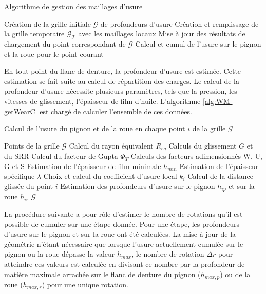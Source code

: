 \begin{algorithm}
\caption{Algorithme de gestion des maillages d'usure}
\label{alg:WM-createGrid}
  \begin{algorithmic}
      \State Création de la grille initiale $\mathcal{G}$ de profondeurs d'usure
    \Else
      \State Création et remplissage de la grille temporaire $\mathcal{G_T}$ avec les maillages locaux
          \State Mise à jour des résultats de chargement du point correspondant de $\mathcal{G}$
      \EndFor
    \EndIf
      \State Calcul et cumul de l'usure sur le pignon et la roue pour le point courant
    \EndFor
  \end{algorithmic}
\end{algorithm}

\FloatBarrier
En tout point du flanc de denture, la profondeur d'usure est estimée. Cette estimation se fait suite au calcul de répartition des charges. Le calcul de la profondeur d'usure nécessite plusieurs paramètres, tels que la pression, les vitesses de glissement, l'épaisseur de film d'huile. L'algorithme \ref{alg:WM-getWearC} est chargé de calculer l'ensemble de ces données.

\begin{algorithm}
\caption{Calcul de l'usure du pignon et de la roue en chaque point $i$ de la grille $\mathcal{G}$}
\label{alg:WM-getWearC}
  \begin{algorithmic}
    \Require Points de la grille $\mathcal{G}$
      \State Calcul du rayon équivalent $R_{eq}$
      \State Calculs du glissement $G$ et du SRR
      \State Calcul du facteur de Gupta $\Phi_T$
      \State Calculs des facteurs adimensionnés W, U, G et S
      \State Estimation de l'épaisseur de film minimale $h_{min}$
      \State Estimation de l'épaisseur spécifique $\lambda$
      \State Choix et calcul du coefficient d'usure local $k_i$
      \State Calcul de la distance glissée du point $i$
	    \State Estimation des profondeurs d'usure sur le pignon $h_{ip}$ et sur la roue $h_{ir}$
    \EndFor
    \State \Return $\mathcal{G}$
  \end{algorithmic}
\end{algorithm}
\FloatBarrier
La procédure suivante a pour rôle d'estimer le nombre de rotations qu'il est possible de cumuler sur une étape donnée. Pour une étape, les profondeurs d'usure sur le pignon et sur la roue ont été calculées. La mise à jour de la géométrie n'étant nécessaire que lorsque l'usure actuellement cumulée sur le pignon ou la roue dépasse la valeur $h_{max}$, le nombre de rotation $\Delta r$ pour atteindre ces valeurs est calculée en divisant ce nombre par la profondeur de matière maximale arrachée sur le flanc de denture du pignon ($h_{max,p}$) ou de la roue ($h_{max,r}$) pour une unique rotation.

